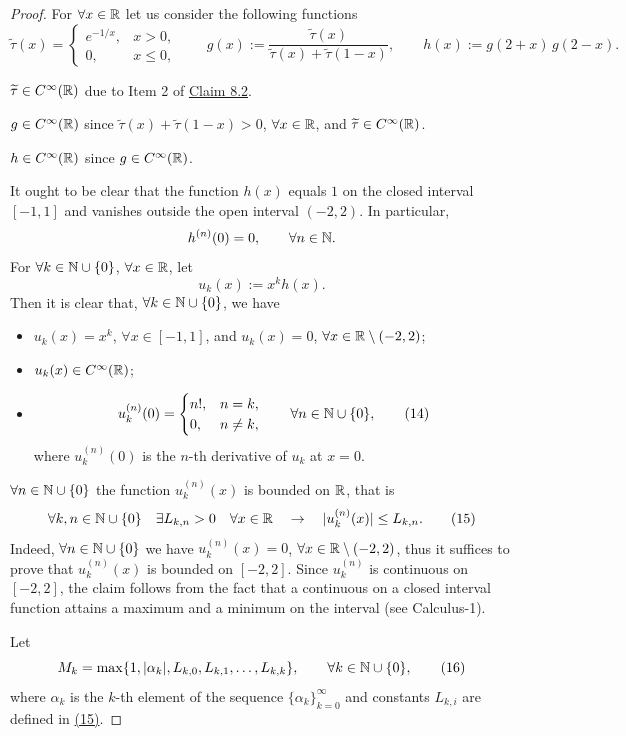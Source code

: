 \begin{proof}
For $\forall x\in\mathbb{R}$ let us consider the following functions
\[
\widetilde\tau(x)=
\begin{cases}
e^{-1/x},&x>0,\\0,&x\leq0,
\end{cases}
\qquad
 g(x):=\frac{\widetilde\tau(x)}{\widetilde\tau(x)+\widetilde\tau(1-x)},
\qquad
 h(x):=g(2+x)\,g(2-x).
\]

$\widetilde\tau\in C^\infty(\mathbb{R})$ due to Item 2 of \hyperref[claim:8.2]{Claim 8.2}.

$g\in C^\infty(\mathbb{R})$ since $\widetilde\tau(x)+\widetilde\tau(1-x)>0$, $\forall x\in\mathbb{R}$, and $\widetilde\tau\in C^\infty(\mathbb{R})$.

$h\in C^\infty(\mathbb{R})$ since $g\in C^\infty(\mathbb{R})$.

It ought to be clear that the function $h(x)$ equals $1$ on the closed interval $[-1,1]$ and vanishes outside the open interval $(-2,2)$. In particular,
\[
h^{(n)}(0)=0,\qquad \forall n\in\mathbb{N}.
\]
For $\forall k\in\mathbb{N}\cup\{0\}$, $\forall x\in\mathbb{R}$, let
\[
u_k(x):=x^k h(x).
\]
Then it is clear that, $\forall k\in\mathbb{N}\cup\{0\}$, we have
\begin{itemize}
    \item $u_k(x)=x^k$, $\forall x\in[-1,1]$, and $u_k(x)=0$, $\forall x\in\mathbb{R}\setminus(-2,2)$;
    \item $u_k(x)\in C^\infty(\mathbb{R})$;
    \item
    \[
    u_k^{(n)}(0)=
    \begin{cases}
n!,&n=k,\\0,&n\neq k,
    \end{cases}
    \qquad \forall n\in\mathbb{N}\cup\{0\},
    \tag{14}\label{eq:8:14:1}
    \]
    where $u_k^{(n)}(0)$ is the $n$-th derivative of $u_k$ at $x=0$.
\end{itemize}

$\forall n\in\mathbb{N}\cup\{0\}$ the function $u_k^{(n)}(x)$ is bounded on $\mathbb{R}$, that is
\[
\forall k,n\in\mathbb{N}\cup\{0\}\quad \exists L_{k,n}>0\quad \forall x\in\mathbb{R}
\quad\to\quad |u_k^{(n)}(x)|\leq L_{k,n}.
\tag{15}\label{eq:8:15:1}
\]
Indeed, $\forall n\in\mathbb{N}\cup\{0\}$ we have $u_k^{(n)}(x)=0$, $\forall x\in\mathbb{R}\setminus(-2,2)$, thus it suffices to prove that $u_k^{(n)}(x)$ is bounded on $[-2,2]$. Since $u_k^{(n)}$ is continuous on $[-2,2]$, the claim follows from the fact that a continuous on a closed interval function attains a maximum and a minimum on the interval (see Calculus-1).

Let
\[
M_k=\max\{1,|\alpha_k|,L_{k,0},L_{k,1},\ldots,L_{k,k}\},
\qquad \forall k\in\mathbb{N}\cup\{0\},
\tag{16}\label{eq:8:16:1}
\]
where $\alpha_k$ is the $k$-th element of the sequence $\{\alpha_k\}_{k=0}^{\infty}$ and constants $L_{k,i}$ are defined in \hyperref[eq:8:15:1]{(15)}.


\end{proof}
